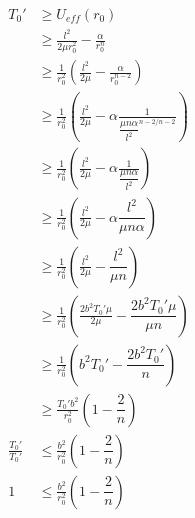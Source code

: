 \documentclass[11pt]{article}
\numberwithin{equation}{section}
\begin{document}
\begin{align*}
T_0' &\ge U_{eff}(r_0)\\
&\ge \frac{l^2}{2\mu r_0^2} - \frac{\alpha}{r_0^n}\\
&\ge \frac{1}{r_0^2}\left(\frac{l^2}{2\mu} - \frac{\alpha}{r_0^{n-2}}\right)\\
&\ge \frac{1}{r_0^2}\left(\frac{l^2}{2\mu} - \alpha\frac{1}{\dfrac{\mu n\alpha}{l^2}^{n-2/n-2}}\right)\\
&\ge \frac{1}{r_0^2}\left(\frac{l^2}{2\mu} - \alpha\frac{1}{\dfrac{\mu n\alpha}{l^2}}\right)\\
&\ge \frac{1}{r_0^2}\left(\frac{l^2}{2\mu} - \alpha \dfrac{l^2}{\mu n\alpha}\right)\\
&\ge \frac{1}{r_0^2}\left(\frac{l^2}{2\mu} - \dfrac{l^2}{\mu n}\right)\\
&\ge \frac{1}{r_0^2}\left(\frac{2b^2 T_0'\mu}{2\mu} - \dfrac{2b^2T_0'\mu}{\mu n}\right)\\
&\ge \frac{1}{r_0^2}\left(b^2 T_0' - \dfrac{2b^2T_0'}{n}\right)\\
&\ge \frac{T_0'b^2}{r_0^2}\left(1 - \dfrac{2}{n}\right)\\
\frac{T_0'}{T_0'} &\le \frac{b^2}{r_0^2}\left(1 - \dfrac{2}{n}\right)\\
1 &\le \frac{b^2}{r_0^2}\left(1 - \dfrac{2}{n}\right)
\end{align*}
\end{document}

